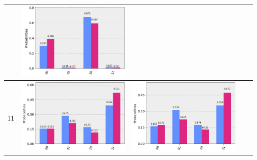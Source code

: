 \documentclass[11pt]{article}
\begin{document}
\begin{table}[h!]
\begin{tabular}{| c | c | c | c | c | }
\begin{minipage}{.215\textwidth}
      \end{minipage}
      &\begin{minipage}{.215\textwidth}
        \includegraphics[width=\linewidth]{img/qecc3_I10.png}
      \end{minipage}
      \\ \hline
      11 & 
      \begin{minipage}{.215\textwidth}
        \includegraphics[width=\linewidth]{img/qecc3_X11.png}
      \end{minipage}&
      \begin{minipage}{.215\textwidth}
        \includegraphics[width=\linewidth]{img/qecc3_Y11.png}

\end{minipage}
\end{tabular}
\end{table}
\end{document}
